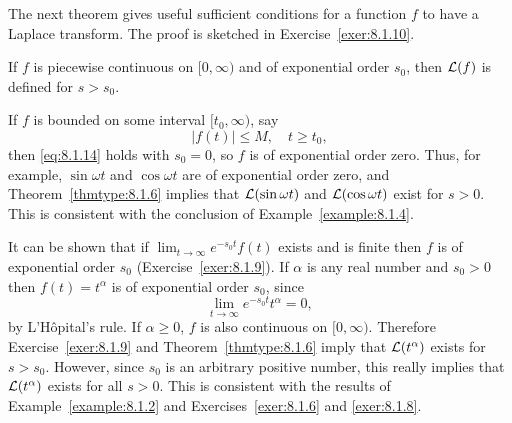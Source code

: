 The next theorem gives useful sufficient conditions for a function $f$ to have a Laplace transform.
The proof is sketched in Exercise~\ref{exer:8.1.10}.

\begin{theorem}
  \color{blue}
  \label{thmtype:8.1.6} If $f$ is piecewise continuous on $[0,\infty)$ and of exponential order
  $s_{0}$, then ${\cal L}(f)$ is defined for $s>s_{0}$.
\end{theorem}

\color{blue}
\color{black}

\begin{example}
  \label{example:8.1.8}\rm If $f$ is bounded on some interval $[t_{0},\infty)$, say
  \[
    |f(t)|\le M,\quad t\ge t_{0},
  \]
  then \eqref{eq:8.1.14} holds with $s_{0}=0$, so $f$ is of exponential order zero. Thus, for
  example, $\sin\omega t$ and $\cos\omega t$ are of exponential order zero, and
  Theorem~\ref{thmtype:8.1.6} implies that ${\cal L}(\sin\omega t)$ and ${\cal L}(\cos\omega t)$
  exist for $s>0$. This is consistent with the conclusion of Example~\ref{example:8.1.4}.
\end{example}

\begin{example}
  \label{example:8.1.9}\rm It can be shown that if $\lim_{t\to\infty}e^{-s_{0}t}f(t)$ exists and is
  finite then $f$ is of exponential order $s_{0}$ (Exercise~\ref{exer:8.1.9}). If $\alpha$ is any
  real number and $s_{0}>0$ then $f(t)=t^{\alpha}$ is of exponential order $s_{0}$, since
  \[
    \lim_{t\to\infty}e^{-s_{0}t}t^{\alpha}=0,
  \]
  by L'H\^opital's rule. If $\alpha\ge0$, $f$ is also continuous on $[0,\infty)$. Therefore
  Exercise~\ref{exer:8.1.9} and Theorem~\ref{thmtype:8.1.6} imply that ${\cal L}(t^{\alpha})$ exists
  for $s> s_{0}$. However, since $s_{0}$ is an arbitrary positive number, this really implies that
  ${\cal L}(t^{\alpha})$ exists for all $s>0$. This is consistent with the results of
  Example~\ref{example:8.1.2} and Exercises~\ref{exer:8.1.6} and \ref{exer:8.1.8}.
\end{example}

